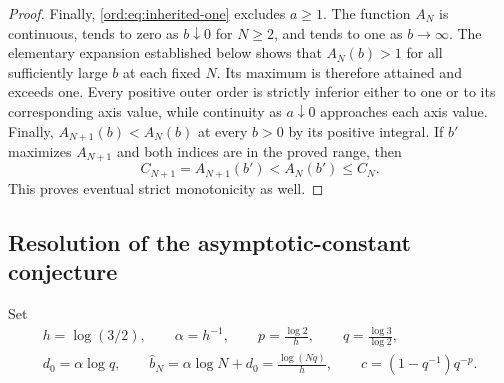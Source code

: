 \begin{proof}
Finally, \eqref{ord:eq:inherited-one} excludes $a\ge1$. The function
$A_N$ is continuous, tends to zero as $b\downarrow0$ for $N\ge2$, and
tends to one as $b\to\infty$. The elementary expansion established
below shows that $A_N(b)>1$ for all sufficiently large $b$ at each fixed
$N$. Its maximum is therefore attained and exceeds one. Every positive
outer order is strictly inferior either to one or to its corresponding
axis value, while continuity as $a\downarrow0$ approaches each axis
value. Finally, $A_{N+1}(b)<A_N(b)$ at every $b>0$ by its positive
integral. If $b'$ maximizes $A_{N+1}$ and both indices are in the proved
range, then
\[
 C_{N+1}=A_{N+1}(b')<A_N(b')\le C_N.
\]
This proves eventual strict monotonicity as well.
\end{proof}

\subsection{Resolution of the asymptotic-constant conjecture}

Set
\begin{equation}\label{ord:eq:constants}
 \begin{gathered}
 h=\log(3/2),\qquad \alpha=h^{-1},\qquad
 p=\frac{\log2}{h},\qquad q=\frac{\log3}{\log2},\\
 d_0=\alpha\log q,\qquad
 \widehat b_N=\alpha\log N+d_0=\frac{\log(Nq)}h,\qquad
 c=(1-q^{-1})q^{-p}.
 \end{gathered}
\end{equation}

